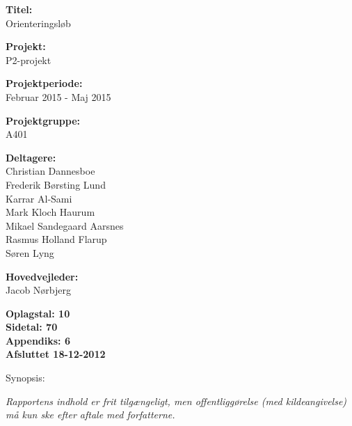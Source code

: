 \begin{minipage}[t]{0.48\textwidth}
\textbf{Titel:} \\[5pt]\bigskip\hspace{2ex}
Orienteringsløb

\textbf{Projekt:} \\[5pt]\bigskip\hspace{2ex}
P2-projekt

\textbf{Projektperiode:} \\[5pt]\bigskip\hspace{2ex}
Februar 2015 - Maj 2015

\textbf{Projektgruppe:} \\[5pt]\bigskip\hspace{2ex}
A401	

\textbf{Deltagere:} \\[5pt]\hspace*{2ex}
Christian Dannesboe \\\hspace*{2ex}
Frederik Børsting Lund \\\hspace*{2ex}
Karrar Al-Sami \\\hspace*{2ex}
Mark Kloch Haurum \\\hspace*{2ex}
Mikael Sandegaard Aarsnes \\\hspace*{2ex}
Rasmus Holland Flarup \\\bigskip\hspace{2ex}
Søren Lyng

\textbf{Hovedvejleder:} \\[5pt]\hspace*{2ex}
Jacob Nørbjerg \\\bigskip\hspace{2ex}

\hspace*{2ex}
\bigskip\hspace{2ex}
\vspace*{1cm}

\textbf{Oplagstal: 10} \\
\textbf{Sidetal: 70} \\
\textbf{Appendiks: 6} \\ 
\textbf{Afsluttet 18-12-2012}

\end{minipage}
\hfill
\begin{minipage}[t]{0.483\textwidth}
Synopsis: \\[5pt]
\fbox{\parbox{7cm}{\bigskip\bigskip}}
\end{minipage}

\vfill

{\footnotesize\itshape Rapportens indhold er frit tilgængeligt, men offentliggørelse (med kildeangivelse) må kun ske efter aftale med forfatterne.}

